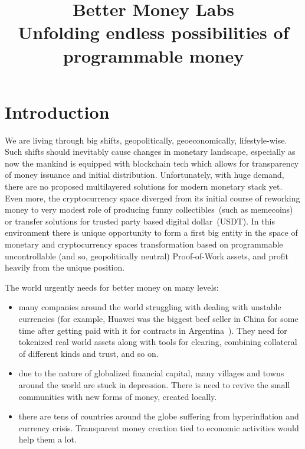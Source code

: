 \documentclass{llncs}   %
\begin{document}
\title{Better Money Labs\\ \small Unfolding endless possibilities of programmable money}

\author{}%

\maketitle

\section{Introduction}

We are living through big shifts, geopolitically, geoeconomically, lifestyle-wise. Such shifts should inevitably cause changes in monetary landscape, especially as now the mankind is equipped with blockchain tech which allows for transparency of money issuance and initial distribution.
Unfortunately, with huge demand, there are no proposed multilayered solutions for modern monetary stack yet. Even more, the cryptocurrency space diverged from its initial course of reworking money to very modest role of producing funny collectibles~(such as memecoins) or transfer solutions
 for trusted party based digital dollar~(USDT).
In this environment there is unique opportunity to form a first big entity in the space of monetary and cryptocurrency spaces transformation based on programmable
uncontrollable (and so, geopolitically neutral) Proof-of-Work assets, and profit heavily from the unique position.

The world urgently needs for better money on many levels:
\begin{itemize}
  \item many companies around the world struggling with dealing with unstable currencies (for example, Huawei was the biggest beef seller in China for some time after getting paid with it for contracts in Argentina~\cite{huawei}). They need for tokenized real world assets along with tools for clearing, combining collateral of different kinds and trust, and so on.
  \item due to the nature of globalized financial capital, many villages and towns around the world are stuck in depression. There is need to revive the small communities with new forms of money, created locally.
  \item there are tens of countries around the globe suffering from hyperinflation and currency crisis. Transparent money creation tied to economic activities would help them a lot.
\end{itemize}
\end{document}
